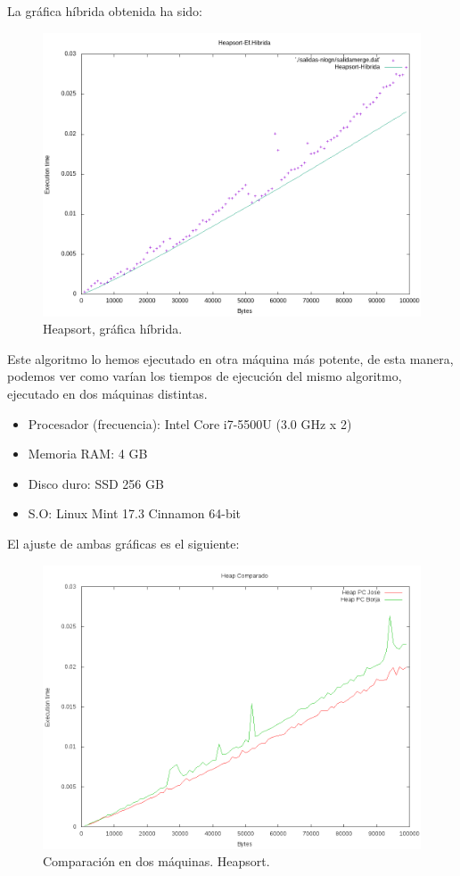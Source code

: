 La gráfica híbrida obtenida ha sido:
\begin{figure}[H]
	\centering
	\includegraphics[scale=0.5]{imagenes/heapsort-hibrida.png}
	\caption{Heapsort, gráfica híbrida.}
	\label{fig:E12}
\end{figure}
Este algoritmo lo hemos ejecutado en otra máquina más potente, de esta manera, podemos ver como varían los tiempos de ejecución del mismo algoritmo, ejecutado en dos máquinas distintas.
\begin{itemize}
	\item Procesador (frecuencia): Intel Core i7-5500U (3.0 GHz x 2)
	\item Memoria RAM: 4 GB
	\item Disco duro: SSD 256 GB
	\item S.O: Linux Mint 17.3 Cinnamon 64-bit
\end{itemize}
El ajuste de ambas gráficas es el siguiente:
\begin{figure}[H]
	\centering
	\includegraphics[scale=0.5]{imagenes/HeapComparado.png}
	\caption{Comparación en dos máquinas. Heapsort.}
	\label{fig:E13}
\end{figure}

